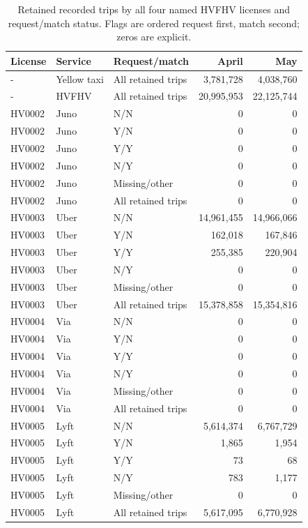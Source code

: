 \begin{table}[htbp]
\centering\small
\caption{Retained recorded trips by all four named HVFHV licenses and request/match status. Flags are ordered request first, match second; zeros are explicit.}
\begin{tabular}{lllrr}
\hline
License & Service & Request/match & April & May \\
\hline
- & Yellow taxi & All retained trips & 3,781,728 & 4,038,760 \\
- & HVFHV & All retained trips & 20,995,953 & 22,125,744 \\
HV0002 & Juno & N/N & 0 & 0 \\
HV0002 & Juno & Y/N & 0 & 0 \\
HV0002 & Juno & Y/Y & 0 & 0 \\
HV0002 & Juno & N/Y & 0 & 0 \\
HV0002 & Juno & Missing/other & 0 & 0 \\
HV0002 & Juno & All retained trips & 0 & 0 \\
HV0003 & Uber & N/N & 14,961,455 & 14,966,066 \\
HV0003 & Uber & Y/N & 162,018 & 167,846 \\
HV0003 & Uber & Y/Y & 255,385 & 220,904 \\
HV0003 & Uber & N/Y & 0 & 0 \\
HV0003 & Uber & Missing/other & 0 & 0 \\
HV0003 & Uber & All retained trips & 15,378,858 & 15,354,816 \\
HV0004 & Via & N/N & 0 & 0 \\
HV0004 & Via & Y/N & 0 & 0 \\
HV0004 & Via & Y/Y & 0 & 0 \\
HV0004 & Via & N/Y & 0 & 0 \\
HV0004 & Via & Missing/other & 0 & 0 \\
HV0004 & Via & All retained trips & 0 & 0 \\
HV0005 & Lyft & N/N & 5,614,374 & 6,767,729 \\
HV0005 & Lyft & Y/N & 1,865 & 1,954 \\
HV0005 & Lyft & Y/Y & 73 & 68 \\
HV0005 & Lyft & N/Y & 783 & 1,177 \\
HV0005 & Lyft & Missing/other & 0 & 0 \\
HV0005 & Lyft & All retained trips & 5,617,095 & 6,770,928 \\
\hline
\end{tabular}
\end{table}

